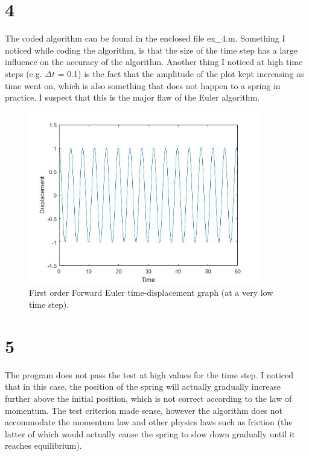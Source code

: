 \documentclass[12pt, a4paper]{article}
\begin{document}
	\part*{4}
	The coded algorithm can be found in the enclosed file ex\_4.m. Something I noticed while coding the algorithm, is that the size of the time step has a large influence on the accuracy of the algorithm. Another thing I noticed at high time steps (e.g. $\Delta t$ = 0.1) is the fact that the amplitude of the plot kept increasing as time went on, which is also something that does not happen to a spring in practice. I suspect that this is the major flaw of the Euler algorithm.
	\begin{figure}[!ht]
		\centering
		\includegraphics[width=0.9\textwidth]{4}
		\caption{First order Forward Euler time-displacement graph (at a very low time step).}
	\end{figure} 
	\newpage
	\part*{5}
	The program does not pass the test at high values for the time step. I noticed that in this case, the position of the spring will actually gradually increase further above the initial position, which is not correct according to the law of momentum. The test criterion made sense, however the algorithm does not accommodate the momentum law and other physics laws such as friction (the latter of which would actually cause the spring to slow down gradually until it reaches equilibrium).
\end{document}
